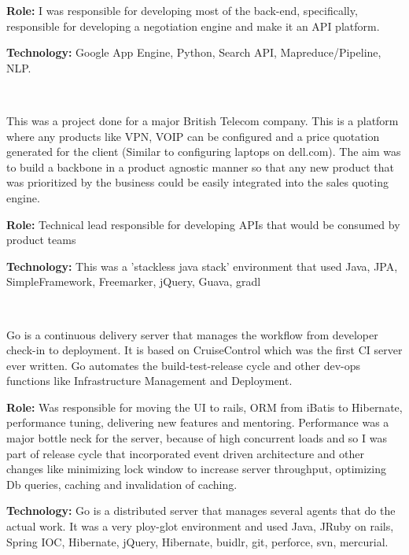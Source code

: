 \begin{resume}
\begin{position}
{\textbf{Role:}} I was responsible for developing most of the back-end, specifically, responsible for developing a negotiation engine and make it an API platform.

{\textbf{Technology:}} Google App Engine, Python, Search API, Mapreduce/Pipeline, NLP. 
\end{position}\\

\begin{position}
This was a project done for a major British Telecom company. This is a platform where any products like VPN, VOIP can be configured and a price quotation generated for the client (Similar to configuring laptops on dell.com). The aim was to build a backbone in
a product agnostic manner so that any new product that was prioritized by the business could be easily integrated into the sales quoting engine.

{\textbf{Role:}} Technical lead responsible for developing APIs that would be consumed by product teams

{\textbf{Technology:}} This was a 'stackless java stack' environment that used Java, JPA, SimpleFramework, Freemarker, jQuery, Guava, gradl
\end{position}\\

\begin{position}
Go is a continuous delivery server that manages the workflow from developer check-in to deployment. It is based on CruiseControl which was the first CI server ever written. Go automates the build-test-release cycle and other dev-ops functions like Infrastructure Management and Deployment.

{\textbf{Role:}} Was responsible for moving the UI to rails, ORM from iBatis to Hibernate, performance tuning, delivering new features and mentoring. Performance was a major bottle neck for the server, because of high concurrent loads and so I was part of release cycle that incorporated event driven architecture and other changes like minimizing lock window to increase server throughput, optimizing Db queries, caching and invalidation of caching. 

{\textbf{Technology:}} Go is a distributed server that manages several agents that do the actual work. It was a very ploy-glot environment and used Java, JRuby on rails, Spring IOC, Hibernate, jQuery, Hibernate, buidlr, git, perforce, svn, mercurial.
\end{position}\\



\end{resume}
